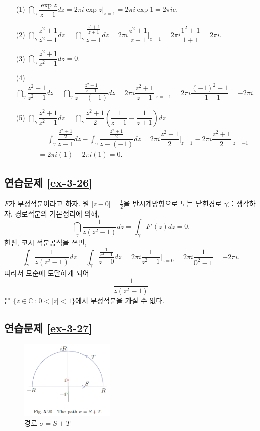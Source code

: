 \begin{itemize}
\item[(1)] $\dint_\gamma \dfrac{\exp z}{z-1}dz = 2\pi i \exp z \Big|_{z=1}
= 2\pi i \exp 1 = 2\pi i  e$.
\item[(2)] $\dint_\gamma \dfrac{z^2+1}{z^2-1}dz 
= \dint_\gamma \dfrac {\frac{z^2+1}{z+1}}{z-1}dz
= 2\pi i \dfrac{z^2+1}{z+1} \Big|_{z=1} = 2\pi i \dfrac{1^2+1}{1+1} = 2\pi i$.
\item[(3)] $\dint_\gamma \dfrac{z^2+1}{z^2-1}dz = 0$.
\item[(4)] $\dint_\gamma \dfrac{z^2+1}{z^2-1}dz 
= \dint_\gamma \dfrac{\frac{z^2+1}{z-1}}{z-(-1)}dz 
= 2\pi i \dfrac{z^2+1}{z-1} \Big|_{z=-1} = 2\pi i \dfrac{(-1)^2+1}{-1-1} = -2\pi i$.
\item[(5)] $\dint_\gamma \dfrac{z^2+1}{z^2-1}dz 
= \dint_\gamma \dfrac{z^2+1}2 \left(\dfrac1{z-1} - \dfrac1{z+1}\right)dz$
\begin{align*}
\quad &= \int_\gamma \dfrac{\frac{z^2+1}2}{z-1}dz 
- \int_\gamma \dfrac{\frac{z^2+1}2}{z-(-1)}dz 
= 2\pi i \dfrac{z^2+1}2\Big|_{z=1} - 2\pi i \dfrac{z^2+1}2 \Big|_{z=-1} \\
&= 2\pi i(1) - 2\pi i (1) = 0.
\end{align*}
\end{itemize}

\subsection*{연습문제 \ref{ex-3-26}}

$F$가 부정적분이라고 하자.
원 $|z-0| = \frac12$을 반시계방향으로 도는 닫힌경로 $\gamma$를 생각하자.
경로적분의 기본정리에 의해,
\[
\dint_\gamma \dfrac1{z(z^2-1)}dz = \int_\gamma F'(z)dz = 0.
\]
한편,  코시 적분공식을 쓰면,
\[
\int_\gamma \dfrac1{z(z^2-1)}dz = \int_\gamma  \dfrac{\frac1{z^2-1}}{z-0}dz
= 2\pi i \dfrac1{z^2-1}\Big|_{z=0} = 2\pi i \dfrac1{0^2-1} = - 2\pi i.
\]
따라서 모순에 도달하게 되어
\[
\dfrac1{z(z^2-1)}
\]
은 $\{z\in\mathbb C\,:\, 0<|z|<1\}$에서 부정적분을 가질 수 없다.

\subsection*{연습문제 \ref{ex-3-27}}

\begin{figure}[h!]
\begin{center}
\includegraphics[width=0.4\textwidth]{./Solution/figs/fig-5-20}
\end{center}
\caption{경로 $\sigma=S+T$}
\label{fig-5-20}
\end{figure}

